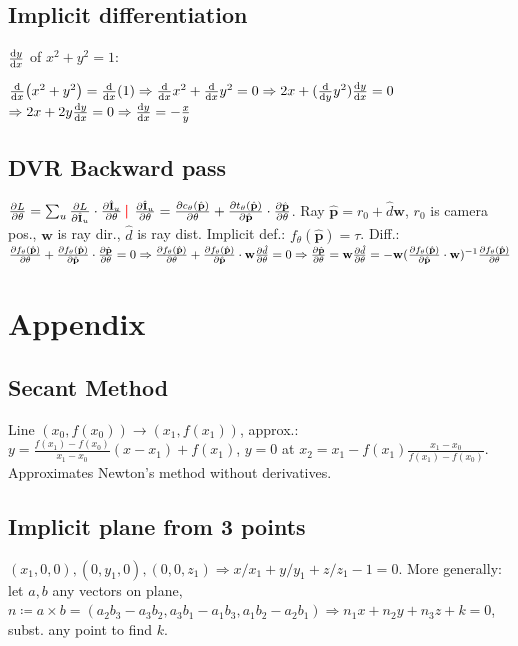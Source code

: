 \documentclass[11pt,landscape,a4paper,fleqn]{article}
\newcommand{\sep}{\,\textcolor{red}{\bm|}\,}
\def\myvector#1{\mathbf{#1}}
\def\vp{{\myvector{p}}}
\def\vw{{\myvector{w}}}
\def\mymatrix#1{\mathbf{#1}}
\def\mI{{\mymatrix{I}}}
\begin{document}
\begin{multicols*}{4}
\subsection*{Implicit differentiation}

$\dv{y}{x}$ of $x^2 + y^2 = 1$:

$\dv{x}(x^2 + y^2) = \dv{x}(1) \Rightarrow \dv{x}x^2 + \dv{x}y^2 = 0 \Rightarrow 2x + (\dv{y} y^2) \dv{y}{x} = 0$
$\Rightarrow 2x + 2y \dv{y}{x} = 0 \Rightarrow \dv{y}{x} =- \frac{x}{y}$

\subsection*{DVR Backward pass}
$\pdv{L}{\theta} = \sum_u \pdv{L}{\hat\mI_u} \cdot \pdv{\hat\mI_u}{\theta} \sep\!$
$\pdv{\hat\mI_u}{\theta} = \pdv{c_\theta(\hat\vp)}{\theta} + \pdv{t_\theta(\hat\vp)}{\hat\vp}
 \cdot \pdv{\hat\vp}{\theta}$.
Ray $\hat\vp = r_0 + \hat{d}\vw$,
$r_0$ is camera pos., $\vw$ is ray dir., $\hat{d}$ is ray dist.
Implicit def.: $f_\theta(\hat\vp) = \tau$.
Diff.:
$\pdv{f_\theta(\hat\vp)}{\theta} + \pdv{f_\theta(\hat\vp)}{\hat\vp} \cdot \pdv{\hat\vp}{\theta} = 0 \Rightarrow
\pdv{f_\theta(\hat\vp)}{\theta} + \pdv{f_\theta(\hat\vp)}{\hat\vp} \cdot \vw\pdv{\hat{d}}{\theta} = 0 \Rightarrow 
\pdv{\hat\vp}{\theta} = \vw \pdv{\hat{d}}{\theta} = - \vw(\pdv{f_\theta(\hat{\vp})}{\hat{\vp}} \cdot \vw)^{-1}
\pdv{f_\theta(\hat\vp)}{\theta}$

\section{Appendix}

\subsection*{Secant Method}

Line $(x_0, f(x_0)) \to (x_1, f(x_1))$, approx.:
$y = \frac{f(x_1) - f(x_0)}{x_1 - x_0}(x - x_1) + f(x_1)$,
$y = 0$ at $x_2 = x_1 - f(x_1) \frac{x_1 - x_0}{f(x_1) - f(x_0)}$.
Approximates Newton's method without derivatives.

\subsection*{Implicit plane from 3 points}

$(x_1, 0, 0), (0, y_1, 0), (0, 0, z_1) \Rightarrow x / x_1 + y / y_1 + z / z_1 - 1 = 0$.
More generally: let $a, b$ any vectors on plane,
$n \coloneqq a \times b = (a_2 b_3 - a_3 b_2, a_3b_1 - a_1b_3, a_1b_2 - a_2b_1) \Rightarrow n_1 x + n_2 y + n_3 z + k = 0$,
subst. any point to find $k$.


\end{multicols*}
\end{document}
